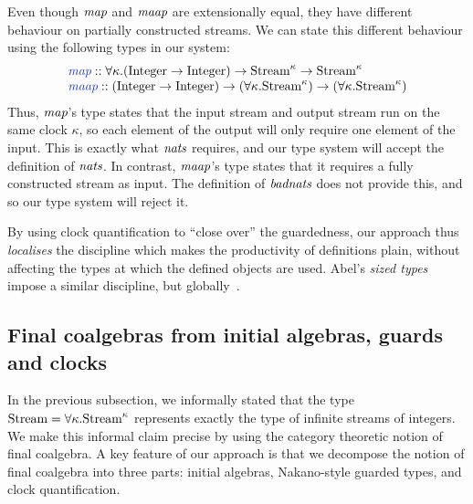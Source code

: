 Even though $\textit{map}$ and $\textit{maap}$ are extensionally equal,
they have different behaviour on partially constructed streams. We can
state this different behaviour using the following types in our system:
\begin{displaymath}
  \begin{array}{l}
    \defn{map} :: \forall \kappa. (\tyname{Integer} \to \tyname{Integer}) \to \tyname{Stream}^\kappa \to \tyname{Stream}^\kappa \\
    \defn{maap} :: (\tyname{Integer} \to \tyname{Integer}) \to (\forall \kappa. \tyname{Stream}^\kappa) \to (\forall \kappa. \tyname{Stream}^\kappa)
  \end{array}
\end{displaymath}
Thus, $\textit{map}$'s type states that the input stream and output
stream run on the same clock $\kappa$, so each element of the output
will only require one element of the input. This is exactly what
$\textit{nats}$ requires, and our type system will accept the
definition of $\textit{nats}$. In contrast, $\textit{maap}$'s type
states that it requires a fully constructed stream as input. The
definition of $\textit{badnats}$ does not provide this, and so our type
system will reject it.

By using clock quantification to ``close over'' the guardedness, our
approach thus \emph{localises} the discipline which makes the
productivity of definitions plain, without affecting the types at
which the defined objects are used. Abel's \emph{sized types} impose a
similar discipline, but globally~\cite{abel04termination}.

\subsection{Final coalgebras from initial algebras, guards and clocks}
\label{sec:main-results-intro}

In the previous subsection, we informally stated that the type
$\textrm{Stream} = \forall \kappa. \textrm{Stream}^\kappa$ represents
exactly the type of infinite streams of integers. We make this
informal claim precise by using the category theoretic notion of final
coalgebra. A key feature of our approach is that we decompose the
notion of final coalgebra into three parts: initial algebras,
Nakano-style guarded types, and clock quantification.

